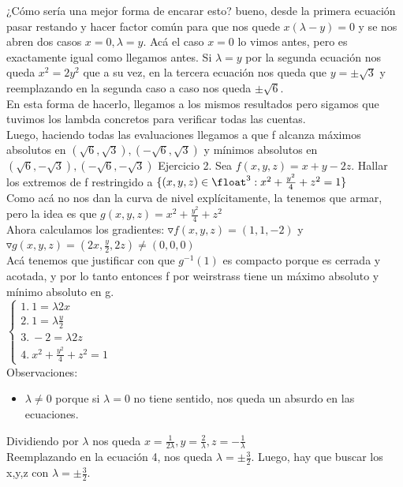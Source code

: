 \documentclass[10pt,a4paper]{article}
\begin{document}
¿Cómo sería una mejor forma de encarar esto? bueno, desde la primera ecuación pasar restando y hacer factor común para que nos quede $x(\lambda - y) = 0$ y se nos abren dos casos $x = 0, \lambda = y$. Acá el caso $x=0$ lo vimos antes, pero es exactamente igual como llegamos antes. Si $\lambda = y$ por la segunda ecuación nos queda $x^{2} = 2y^{2}$ que a su vez, en la tercera ecuación nos queda que $y = \pm \sqrt{3}$ y reemplazando en la segunda caso a caso nos queda $\pm \sqrt{6}$. \\
En esta forma de hacerlo, llegamos a los mismos resultados pero sigamos que tuvimos los lambda concretos para verificar todas las cuentas. \\
Luego, haciendo todas las evaluaciones llegamos a que f alcanza máximos absolutos en $(\sqrt{6}, \sqrt{3}), (-\sqrt{6}, \sqrt{3})$ y mínimos absolutos en $(\sqrt{6}, -\sqrt{3}), (-\sqrt{6}, -\sqrt{3})$
Ejercicio 2. Sea $f(x,y,z) = x+y-2z$. Hallar los extremos de f restringido a $\{(x,y,z) \in \float^{3}: x^{2} + \frac{y^{2}}{4} + z^{2} = 1\}$ \\
Como acá no nos dan la curva de nivel explícitamente, la tenemos que armar, pero la idea es que $g(x,y,z) = x^{2} + \frac{y^{2}}{4}+z^{2}$ \\
Ahora calculamos los gradientes: $\triangledown f(x,y,z) = (1, 1, -2)$ y $\triangledown g(x,y,z) = (2x, \frac{y}{2}, 2z) \neq (0,0,0)$ \\
Acá tenemos que justificar con que $g^{-1}(1)$ es compacto porque es cerrada y acotada, y por lo tanto entonces f por weirstrass tiene un máximo absoluto y mínimo absoluto en g. \\
$
\begin{cases}
    1.\ 1 = \lambda 2x \\
    2.\ 1 = \lambda \frac{y}{2} \\
    3.\ -2 = \lambda 2z \\
    4.\ x^{2} + \frac{y^{2}}{4} + z^{2} = 1
\end{cases}
$ \\
Observaciones:
\begin{itemize}
    \item $\lambda \neq 0$ porque si $\lambda = 0$ no tiene sentido, nos queda un absurdo en las ecuaciones. 
\end{itemize}
Dividiendo por $\lambda$ nos queda $x = \frac{1}{2 \lambda}, y = \frac{2}{\lambda}, z = -\frac{1}{\lambda}$ \\
Reemplazando en la ecuación 4, nos queda $\lambda = \pm \frac{3}{2}$. Luego, hay que buscar los x,y,z con $\lambda = \pm \frac{3}{2}$. \\
\end{document}
